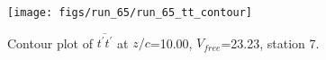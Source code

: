 \begin{figure}[H]
\centering
\texttt{[image: figs/run\_65/run\_65\_tt\_contour]}
\caption{Contour plot of $\overline{t^\prime t^\prime}$ at $z/c$=10.00, $V_{free}$=23.23, station 7.}
\end{figure}


